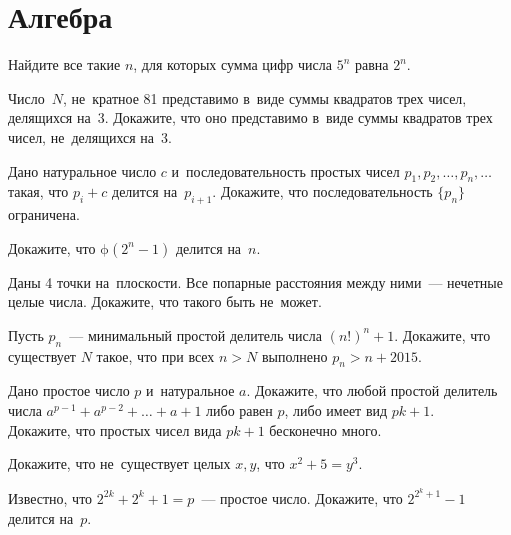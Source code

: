 

\section*{Алгебра}


\begin{problems}

\item
Найдите все такие $n$, для которых сумма цифр числа $5^n$ равна $2^n$.

\item
Число~$N$, не~кратное 81 представимо в~виде суммы квадратов трех чисел,
делящихся на~3.
Докажите, что оно представимо в~виде суммы квадратов трех чисел, не~делящихся
на~3.

\item
Дано натуральное число $c$ и~последовательность простых чисел
$p_1, p_2, \ldots, p_n, \ldots$ такая, что $p_i + c$ делится на~$p_{i+1}$.
Докажите, что последовательность $\{p_n\}$ ограничена.

\item
Докажите, что $\mathrm{\phi}(2^n - 1)$ делится на~$n$.

\item
Даны 4 точки на~плоскости.
Все попарные расстояния между ними~— нечетные целые числа.
Докажите, что такого быть не~может.

\item
Пусть $p_n$~— минимальный простой делитель числа $(n!)^n + 1$.
Докажите, что существует $N$ такое, что при всех $n > N$ выполнено
$p_n > n + 2015$.

\item
\subproblem
Дано простое число $p$ и~натуральное $a$.
Докажите, что любой простой делитель числа $a^{p-1} + a^{p-2} + \ldots + a + 1$
либо равен $p$, либо имеет вид $p k + 1$.
\\
\subproblem
Докажите, что простых чисел вида $p k + 1$ бесконечно много.

\item
Докажите, что не~существует целых $x, y$, что $x^2 + 5 = y^3$.

\item
Известно, что $2^{2k} + 2^k + 1 = p$~— простое число.
Докажите, что $2^{2^k+1} - 1$ делится на~$p$.

\end{problems}

